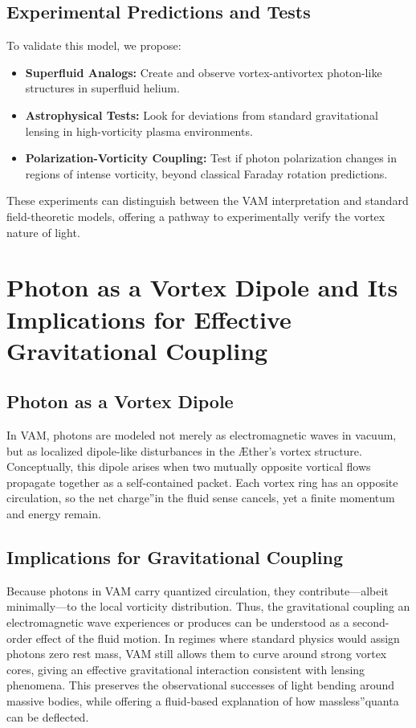 \documentclass[a4paper,12pt]{article}
\begin{document}
\subsection{Experimental Predictions and Tests}
To validate this model, we propose:
\begin{itemize}
    \item \textbf{Superfluid Analogs:} Create and observe vortex-antivortex photon-like structures in superfluid helium.
    \item \textbf{Astrophysical Tests:} Look for deviations from standard gravitational lensing in high-vorticity plasma environments.
    \item \textbf{Polarization-Vorticity Coupling:} Test if photon polarization changes in regions of intense vorticity, beyond classical Faraday rotation predictions.
\end{itemize}

These experiments can distinguish between the VAM interpretation and standard field-theoretic models, offering a pathway to experimentally verify the vortex nature of light.

\section{Photon as a Vortex Dipole and Its Implications for Effective Gravitational Coupling}

\subsection{Photon as a Vortex Dipole}
In VAM, photons are modeled not merely as electromagnetic waves in vacuum, but as localized dipole-like disturbances in the Æther's vortex structure. Conceptually, this dipole arises when two mutually opposite vortical flows propagate together as a self-contained packet. Each vortex ring has an opposite circulation, so the net \grqq charge\textquotedblright in the fluid sense cancels, yet a finite momentum and energy remain.

\subsection{Implications for Gravitational Coupling}
Because photons in VAM carry quantized circulation, they contribute—albeit minimally—to the local vorticity distribution. Thus, the gravitational coupling an electromagnetic wave experiences or produces can be understood as a second-order effect of the fluid motion. In regimes where standard physics would assign photons zero rest mass, VAM still allows them to curve around strong vortex cores, giving an effective gravitational interaction consistent with lensing phenomena. This preserves the observational successes of light bending around massive bodies, while offering a fluid-based explanation of how \grqq massless\textquotedblright quanta can be deflected.
\end{document}
